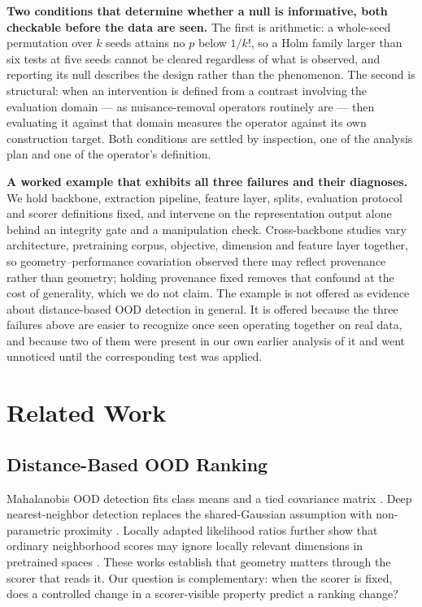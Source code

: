 \documentclass[pdflatex,sn-basic]{sn-jnl}
\theoremstyle{plain}
\theoremstyle{definition}
\theoremstyle{remark}
\begin{document}
\textbf{Two conditions that determine whether a null is informative, both
checkable before the data are seen.} The first is arithmetic: a whole-seed
permutation over $k$ seeds attains no $p$ below $1/k!$, so a Holm family larger
than six tests at five seeds cannot be cleared regardless of what is observed,
and reporting its null describes the design rather than the phenomenon. The
second is structural: when an intervention is defined from a contrast involving
the evaluation domain --- as nuisance-removal operators routinely are --- then
evaluating it against that domain measures the operator against its own
construction target. Both conditions are settled by inspection, one of the
analysis plan and one of the operator's definition.

\textbf{A worked example that exhibits all three failures and their
diagnoses.} We hold backbone, extraction pipeline, feature layer, splits,
evaluation protocol and scorer definitions fixed, and intervene on the
representation output alone behind an integrity gate and a manipulation check.
Cross-backbone studies vary architecture, pretraining corpus, objective,
dimension and feature layer together, so geometry--performance covariation
observed there may reflect provenance rather than geometry; holding provenance
fixed removes that confound at the cost of generality, which we do not claim.
The example is not offered as evidence about distance-based OOD detection in
general. It is offered because the three failures above are easier to recognize
once seen operating together on real data, and because two of them were present
in our own earlier analysis of it and went unnoticed until the corresponding
test was applied.

\section{Related Work}
\subsection{Distance-Based OOD Ranking}
Mahalanobis OOD detection fits class means and a tied covariance matrix \citep{lee2018simple}. Deep nearest-neighbor detection replaces the shared-Gaussian assumption with non-parametric proximity \citep{sun2022ood}. Locally adapted likelihood ratios further show that ordinary neighborhood scores may ignore locally relevant dimensions in pretrained spaces \citep{ahmadian2024unsupervised}. These works establish that geometry matters through the scorer that reads it. Our question is complementary: when the scorer is fixed, does a controlled change in a scorer-visible property predict a ranking change?
\end{document}
